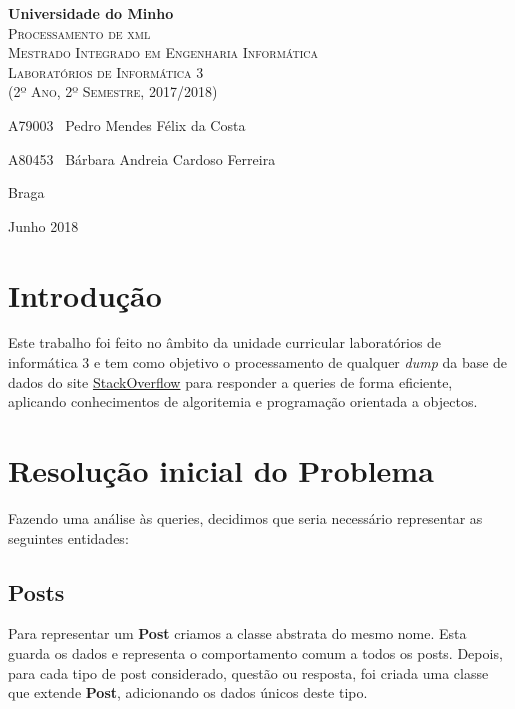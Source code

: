 \documentclass[10pt,a4paper]{report}
\begin{document}
\begin{titlepage}
    \center
    {\huge {\bf Universidade do Minho}}\\[0.4cm]
    \vspace{3.0cm}
    \textsc{\huge{Processamento de xml}}\\[0.5cm]
    \vspace{3.0cm}
    \textsc{\huge{Mestrado Integrado em Engenharia Informática}}\\[0.5cm]
    \vspace{2.0cm}
    \textsc{Laboratórios de Informática 3}\\[0.5cm]
    \textsc{(2º Ano, 2º Semestre, 2017/2018)}\\[0.5cm]
    \vspace{1.5cm}
    \begin{flushleft}
        A79003 \,\,\,Pedro Mendes Félix da Costa
        \vspace{0.2cm}

        A80453 \,\,\,Bárbara Andreia Cardoso Ferreira
    \end{flushleft}
        \vspace{1cm}
    \begin{flushright}
        Braga

        Junho 2018
    \end{flushright}

\end{titlepage}

\tableofcontents
\clearpage

\chapter{Introdução}
    Este trabalho foi feito no âmbito da unidade curricular laboratórios de
    informática 3 e tem como objetivo o processamento de qualquer \textit{dump}
    da base de dados do site \href{www.stackoverflow.com}{StackOverflow} para
    responder a queries de forma eficiente, aplicando conhecimentos de
    algoritemia e programação orientada a objectos.

\chapter{Resolução inicial do Problema}
    Fazendo uma análise às queries, decidimos que seria necessário representar
    as seguintes entidades:

    \section{Posts}
    Para representar um \textbf{Post} criamos a classe abstrata
    do mesmo nome. Esta guarda os dados e representa o comportamento
    comum a todos os posts. Depois, para cada tipo de post considerado, questão
    ou resposta, foi criada uma classe que extende \textbf{Post}, adicionando
    os dados únicos deste tipo.
\end{document}
